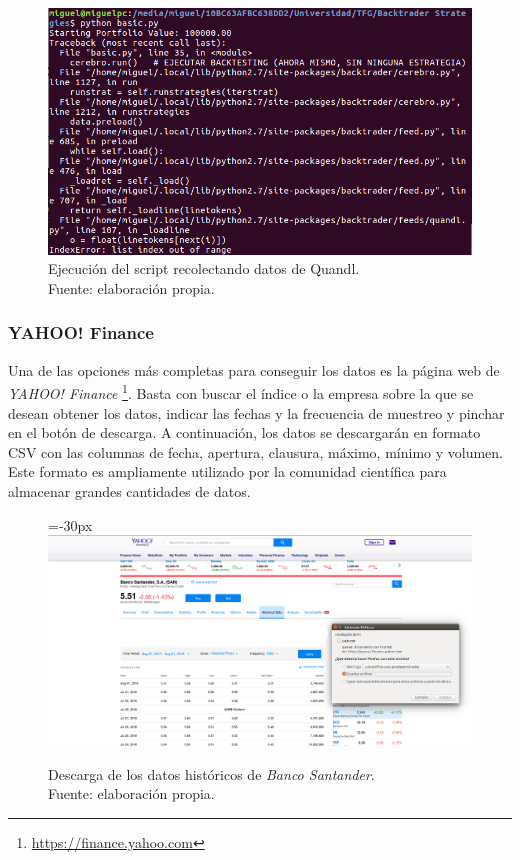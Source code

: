 			\begin{figure}[H]
				\centering
				\includegraphics[scale=1.2]{imagenes/quandl_install.png}
				\caption[Ejecuci\'on del script recolectando datos de Quandl]{Ejecuci\'on del script recolectando datos de Quandl. \\Fuente: elaboraci\'on propia.}
				\label{fig:quandl_install}
			\end{figure}
			
			
		\subsubsection{YAHOO! Finance}
				
		Una de las opciones m\'as completas para conseguir los datos es la p\'agina web de \textit{YAHOO! Finance} \footnote{\url{https://finance.yahoo.com}}. Basta con buscar el \'indice o la empresa sobre la que se desean obtener los datos, indicar las fechas y la frecuencia de muestreo y pinchar en el bot\'on de descarga. A continuaci\'on, los datos se descargar\'an en formato CSV con las columnas de fecha, apertura, clausura, m\'aximo, m\'inimo y volumen. Este formato es ampliamente utilizado por la comunidad cient\'ifica para almacenar grandes cantidades de datos.\\
				
		\begin{figure}[H]
			\centering\leftskip=-30px
			\includegraphics[scale=1]{imagenes/yahoo_finance.png}
			\caption[Descarga de los datos hist\'oricos con \textit{Yahoo! Finance}]{Descarga de los datos hist\'oricos de \textit{Banco Santander}. \\ Fuente: elaboraci\'on propia.}
			\label{fig:yahoo_finance}
		\end{figure}
				
